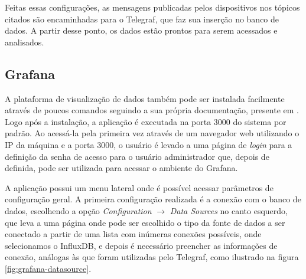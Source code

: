 \documentclass[../monografia.tex]{subfiles}
\begin{document}
Feitas essas configurações, as mensagens publicadas pelos dispositivos nos tópicos citados são encaminhadas para o Telegraf, que faz sua inserção no banco de dados. A partir desse ponto, os dados estão prontos para serem acessados e analisados.

\subsection{Grafana}

A plataforma de visualização de dados também pode ser instalada facilmente através de poucos comandos seguindo a sua própria documentação, presente em \cite{grafana-installation}. Logo após a instalação, a aplicação é executada na porta 3000 do sistema por padrão. Ao acessá-la pela primeira vez através de um navegador web utilizando o IP da máquina e a porta 3000, o usuário é levado a uma página de \textit{login} para a definição da senha de acesso para o usuário administrador que, depois de definida, pode ser utilizada para acessar o ambiente do Grafana. 

A aplicação possui um menu lateral onde é possível acessar parâmetros de configuração geral. A primeira configuração realizada é a conexão com o banco de dados, escolhendo a opção \textit{Configuration} $\rightarrow$ \textit{Data Sources} no canto esquerdo, que leva a uma página onde pode ser escolhido o tipo da fonte de dados a ser conectado a partir de uma lista com inúmeras conexões possíveis, onde selecionamos o InfluxDB, e depois é necessário preencher as informações de conexão, análogas às que foram utilizadas pelo Telegraf, como ilustrado na figura \ref{fig:grafana-datasource}.
\end{document}

